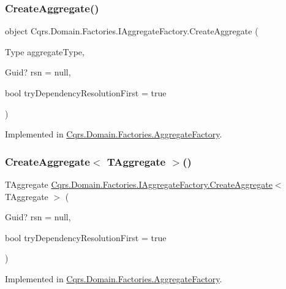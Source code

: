 \subsubsection{\texorpdfstring{Create\+Aggregate()}{CreateAggregate()}}
{\footnotesize\ttfamily object Cqrs.\+Domain.\+Factories.\+I\+Aggregate\+Factory.\+Create\+Aggregate (\begin{DoxyParamCaption}\item[{Type}]{aggregate\+Type,  }\item[{Guid?}]{rsn = {\ttfamily null},  }\item[{bool}]{try\+Dependency\+Resolution\+First = {\ttfamily true} }\end{DoxyParamCaption})}



Implemented in \hyperlink{classCqrs_1_1Domain_1_1Factories_1_1AggregateFactory_aa60839e14ef01b3971067e1f154ee6b4_aa60839e14ef01b3971067e1f154ee6b4}{Cqrs.\+Domain.\+Factories.\+Aggregate\+Factory}.

\mbox{\label{interfaceCqrs_1_1Domain_1_1Factories_1_1IAggregateFactory_aa9723aadb2dfeae42287520d76f3a397_aa9723aadb2dfeae42287520d76f3a397}} 
\subsubsection{\texorpdfstring{Create\+Aggregate$<$ T\+Aggregate $>$()}{CreateAggregate< TAggregate >()}}
{\footnotesize\ttfamily T\+Aggregate \hyperlink{interfaceCqrs_1_1Domain_1_1Factories_1_1IAggregateFactory_a0013390ede7737375e7dbcffcadf3a12_a0013390ede7737375e7dbcffcadf3a12}{Cqrs.\+Domain.\+Factories.\+I\+Aggregate\+Factory.\+Create\+Aggregate}$<$ T\+Aggregate $>$ (\begin{DoxyParamCaption}\item[{Guid?}]{rsn = {\ttfamily null},  }\item[{bool}]{try\+Dependency\+Resolution\+First = {\ttfamily true} }\end{DoxyParamCaption})}



Implemented in \hyperlink{classCqrs_1_1Domain_1_1Factories_1_1AggregateFactory_aa13b39399abe7db18005573c28ab3d2a_aa13b39399abe7db18005573c28ab3d2a}{Cqrs.\+Domain.\+Factories.\+Aggregate\+Factory}.

